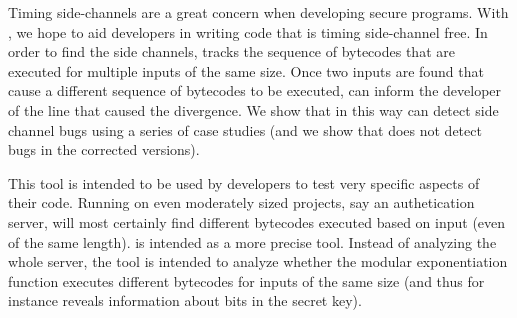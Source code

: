 Timing side-channels are a great concern when developing 
secure programs. With \jcupid, we hope to aid developers in writing
code that is timing side-channel free. In order to find the side
channels, \jcupid 
tracks the sequence of bytecodes that are executed for multiple inputs
of the same size. Once two inputs are found that cause a different
sequence of bytecodes to be executed, \jcupid can inform the developer
of the line that caused the
divergence. We show that in this way \jcupid can detect side channel
bugs using a series of case studies (and we show that \jcupid does not
detect bugs in the corrected versions).

This tool is intended to be used by developers to test very
specific aspects of their code. Running \jcupid on even moderately sized
projects, say an authetication server, will most
certainly find different bytecodes executed based on input (even of
the same length). \jcupid is intended as a more precise tool. Instead of 
analyzing the whole server, the tool is
intended to analyze whether the modular exponentiation function
executes different bytecodes for inputs of the same size (and thus for
instance reveals information about bits in the secret key). 
